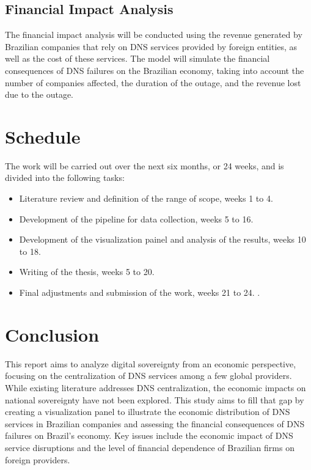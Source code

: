 \documentclass[12pt]{article}
\begin{document}
\subsection{Financial Impact Analysis}

The financial impact analysis will be conducted using the revenue generated by Brazilian companies that rely on DNS services provided by foreign entities, as well as the cost of these services. The model will simulate the financial consequences of DNS failures on the Brazilian economy, taking into account the number of companies affected, the duration of the outage, and the revenue lost due to the outage. 

\section{Schedule}

The work will be carried out over the next six months, or 24 weeks, and is divided into the following tasks:

\begin{itemize}
    \item Literature review and definition of the range of scope, weeks 1 to 4.
    \item Development of the pipeline for data collection, weeks 5 to 16.
    \item Development of the visualization painel and analysis of the results, weeks 10 to 18.
    \item Writing of the thesis, weeks 5 to 20.
    \item Final adjustments and submission of the work, weeks 21 to 24. 
    .
\end{itemize}

\section{Conclusion}

This report aims to analyze digital sovereignty from an economic perspective, focusing on the centralization of DNS services among a few global providers. While existing literature addresses DNS centralization, the economic impacts on national sovereignty have not been explored. This study aims to fill that gap by creating a visualization panel to illustrate the economic distribution of DNS services in Brazilian companies and assessing the financial consequences of DNS failures on Brazil’s economy. Key issues include the economic impact of DNS service disruptions and the level of financial dependence of Brazilian firms on foreign providers.



\end{document}
